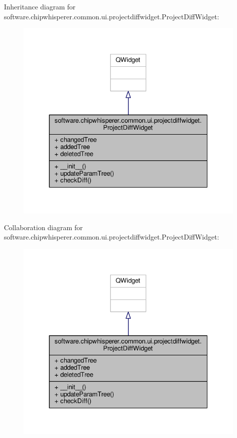 Inheritance diagram for software.\+chipwhisperer.\+common.\+ui.\+projectdiffwidget.\+Project\+Diff\+Widget\+:\nopagebreak
\begin{figure}[H]
\begin{center}
\leavevmode
\includegraphics[width=325pt]{de/def/classsoftware_1_1chipwhisperer_1_1common_1_1ui_1_1projectdiffwidget_1_1ProjectDiffWidget__inherit__graph}
\end{center}
\end{figure}


Collaboration diagram for software.\+chipwhisperer.\+common.\+ui.\+projectdiffwidget.\+Project\+Diff\+Widget\+:\nopagebreak
\begin{figure}[H]
\begin{center}
\leavevmode
\includegraphics[width=325pt]{dd/d7b/classsoftware_1_1chipwhisperer_1_1common_1_1ui_1_1projectdiffwidget_1_1ProjectDiffWidget__coll__graph}
\end{center}
\end{figure}


